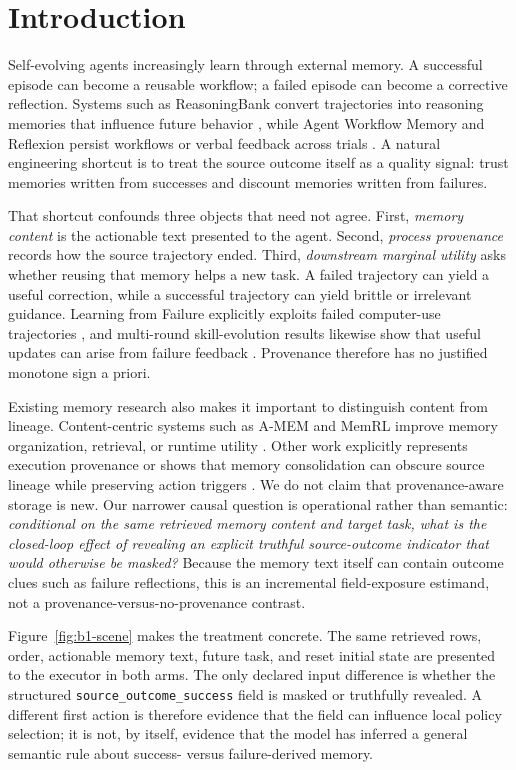 \section{Introduction}
Self-evolving agents increasingly learn through external memory. A successful episode can become a reusable workflow; a failed episode can become a corrective reflection. Systems such as ReasoningBank convert trajectories into reasoning memories that influence future behavior \citep{ouyang2026reasoningbank}, while Agent Workflow Memory and Reflexion persist workflows or verbal feedback across trials \citep{wang2024awm,shinn2023reflexion}. A natural engineering shortcut is to treat the source outcome itself as a quality signal: trust memories written from successes and discount memories written from failures.

That shortcut confounds three objects that need not agree. First, \emph{memory content} is the actionable text presented to the agent. Second, \emph{process provenance} records how the source trajectory ended. Third, \emph{downstream marginal utility} asks whether reusing that memory helps a new task. A failed trajectory can yield a useful correction, while a successful trajectory can yield brittle or irrelevant guidance. Learning from Failure explicitly exploits failed computer-use trajectories \citep{sun2026learningfromfailure}, and multi-round skill-evolution results likewise show that useful updates can arise from failure feedback \citep{liu2026rethinkingfeedback}. Provenance therefore has no justified monotone sign a priori.

Existing memory research also makes it important to distinguish content from lineage. Content-centric systems such as A-MEM and MemRL improve memory organization, retrieval, or runtime utility \citep{xu2025amem,zhang2026memrl}. Other work explicitly represents execution provenance or shows that memory consolidation can obscure source lineage while preserving action triggers \citep{wang2026tracetotrust,xu2026laundering}. We do not claim that provenance-aware storage is new. Our narrower causal question is operational rather than semantic: \emph{conditional on the same retrieved memory content and target task, what is the closed-loop effect of revealing an explicit truthful source-outcome indicator that would otherwise be masked?} Because the memory text itself can contain outcome clues such as failure reflections, this is an incremental field-exposure estimand, not a provenance-versus-no-provenance contrast.

Figure~\ref{fig:b1-scene} makes the treatment concrete. The same retrieved rows, order, actionable memory text, future task, and reset initial state are presented to the executor in both arms. The only declared input difference is whether the structured \texttt{source\_outcome\_success} field is masked or truthfully revealed. A different first action is therefore evidence that the field can influence local policy selection; it is not, by itself, evidence that the model has inferred a general semantic rule about success- versus failure-derived memory.

